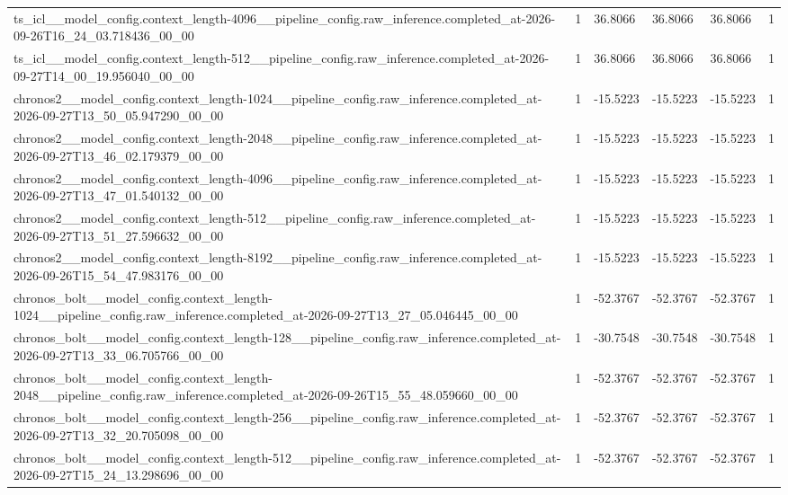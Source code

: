 \begin{tabular}{llllll}
ts\_icl\_\_model\_config.context\_length-4096\_\_pipeline\_config.raw\_inference.completed\_at-2026-09-26T16\_24\_03.718436\_00\_00 & 1 & 36.8066 & 36.8066 & 36.8066 & 1 \\
ts\_icl\_\_model\_config.context\_length-512\_\_pipeline\_config.raw\_inference.completed\_at-2026-09-27T14\_00\_19.956040\_00\_00 & 1 & 36.8066 & 36.8066 & 36.8066 & 1 \\
chronos2\_\_model\_config.context\_length-1024\_\_pipeline\_config.raw\_inference.completed\_at-2026-09-27T13\_50\_05.947290\_00\_00 & 1 & -15.5223 & -15.5223 & -15.5223 & 1 \\
chronos2\_\_model\_config.context\_length-2048\_\_pipeline\_config.raw\_inference.completed\_at-2026-09-27T13\_46\_02.179379\_00\_00 & 1 & -15.5223 & -15.5223 & -15.5223 & 1 \\
chronos2\_\_model\_config.context\_length-4096\_\_pipeline\_config.raw\_inference.completed\_at-2026-09-27T13\_47\_01.540132\_00\_00 & 1 & -15.5223 & -15.5223 & -15.5223 & 1 \\
chronos2\_\_model\_config.context\_length-512\_\_pipeline\_config.raw\_inference.completed\_at-2026-09-27T13\_51\_27.596632\_00\_00 & 1 & -15.5223 & -15.5223 & -15.5223 & 1 \\
chronos2\_\_model\_config.context\_length-8192\_\_pipeline\_config.raw\_inference.completed\_at-2026-09-26T15\_54\_47.983176\_00\_00 & 1 & -15.5223 & -15.5223 & -15.5223 & 1 \\
chronos\_bolt\_\_model\_config.context\_length-1024\_\_pipeline\_config.raw\_inference.completed\_at-2026-09-27T13\_27\_05.046445\_00\_00 & 1 & -52.3767 & -52.3767 & -52.3767 & 1 \\
chronos\_bolt\_\_model\_config.context\_length-128\_\_pipeline\_config.raw\_inference.completed\_at-2026-09-27T13\_33\_06.705766\_00\_00 & 1 & -30.7548 & -30.7548 & -30.7548 & 1 \\
chronos\_bolt\_\_model\_config.context\_length-2048\_\_pipeline\_config.raw\_inference.completed\_at-2026-09-26T15\_55\_48.059660\_00\_00 & 1 & -52.3767 & -52.3767 & -52.3767 & 1 \\
chronos\_bolt\_\_model\_config.context\_length-256\_\_pipeline\_config.raw\_inference.completed\_at-2026-09-27T13\_32\_20.705098\_00\_00 & 1 & -52.3767 & -52.3767 & -52.3767 & 1 \\
chronos\_bolt\_\_model\_config.context\_length-512\_\_pipeline\_config.raw\_inference.completed\_at-2026-09-27T15\_24\_13.298696\_00\_00 & 1 & -52.3767 & -52.3767 & -52.3767 & 1 \\

\end{tabular}
